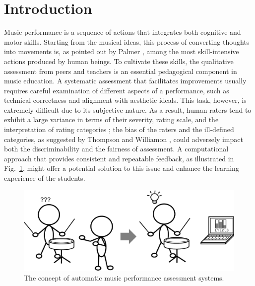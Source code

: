 \documentclass[conference]{IEEEtran}
\begin{document}

%
\IEEEpeerreviewmaketitle



\section{Introduction}
Music performance is a sequence of actions that integrates both cognitive and motor skills. Starting from the musical ideas, this process of converting thoughts into movements is, as pointed out by Palmer \cite{Palmer1997}, among the most skill-intensive actions produced by human beings. To cultivate these skills, the qualitative assessment from  peers and teachers is an essential pedagogical component in music education. A systematic assessment that facilitates improvements usually requires careful examination of different aspects of a performance, such as technical correctness and alignment with aesthetic ideals. This task, however, is extremely difficult due to its subjective nature. As a result, human raters tend to exhibit a large variance in terms of their severity, rating scale, and the interpretation of rating categories \cite{Wesolowski2016}; the bias of the raters and the ill-defined categories, as suggested by Thompson and Williamon \cite{Thompson2003}, could adversely impact both the discriminability and the fairness of assessment. A computational approach that provides consistent and repeatable feedback, as illustrated in Fig.~\ref{fig:basic_idea}, might offer a potential solution to this issue and enhance the learning experience of the students. 

\begin{figure}
\centering
\includegraphics[width = 8 cm]{./figs/basic_idea.pdf}
\caption{The concept of automatic music performance assessment systems.}
\label{fig:basic_idea}
\end{figure}
\end{document}

